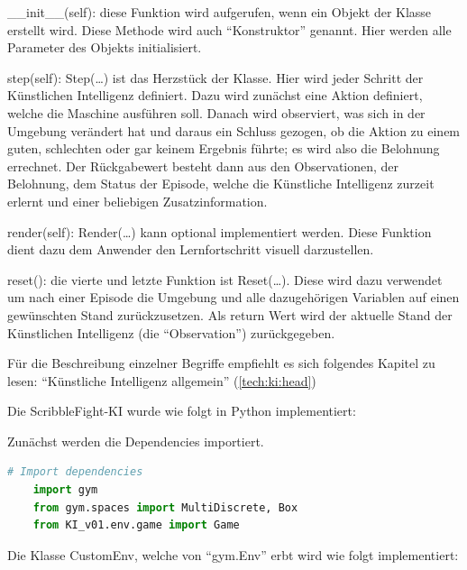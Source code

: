 \begin{compactenum}
    \item \_\_init\_\_(self): diese Funktion wird aufgerufen, wenn ein Objekt der Klasse erstellt wird. Diese Methode wird auch ``Konstruktor'' genannt. Hier werden alle Parameter des Objekts initialisiert.
    \item step(self): Step(\dots) ist das Herzstück der Klasse. Hier wird jeder Schritt der Künstlichen Intelligenz definiert. Dazu wird zunächst eine Aktion definiert, welche die Maschine ausführen soll. Danach wird observiert, was sich in der Umgebung verändert hat und daraus ein Schluss gezogen, ob die Aktion zu einem guten, schlechten oder gar keinem Ergebnis führte; es wird also die Belohnung errechnet. Der Rückgabewert besteht dann aus den Observationen, der Belohnung, dem Status der Episode, welche die Künstliche Intelligenz zurzeit erlernt und einer beliebigen Zusatzinformation.
    \item render(self): Render(\dots) kann optional implementiert werden. Diese Funktion dient dazu dem Anwender den Lernfortschritt visuell darzustellen.
    \item reset(): die vierte und letzte Funktion ist Reset(\dots). Diese wird dazu verwendet um nach einer Episode die Umgebung und alle dazugehörigen Variablen auf einen gewünschten Stand zurückzusetzen. Als return Wert wird der aktuelle Stand der Künstlichen Intelligenz (die ``Observation'') zurückgegeben.
\end{compactenum}

Für die Beschreibung einzelner Begriffe empfiehlt es sich folgendes Kapitel zu lesen: ``Künstliche Intelligenz allgemein'' (\ref {tech:ki:head})

Die ScribbleFight-KI wurde wie folgt in Python implementiert:

Zunächst werden die Dependencies importiert.
\begin{lstlisting}[language=Python,label=lst:maap:scribblefightki,caption=ScribbleFight-KI OpenAI-Gym Environment]
    # Import dependencies
    import gym
    from gym.spaces import MultiDiscrete, Box
    from KI_v01.env.game import Game
\end{lstlisting}

Die Klasse CustomEnv, welche von ``gym.Env'' erbt wird wie folgt implementiert:

